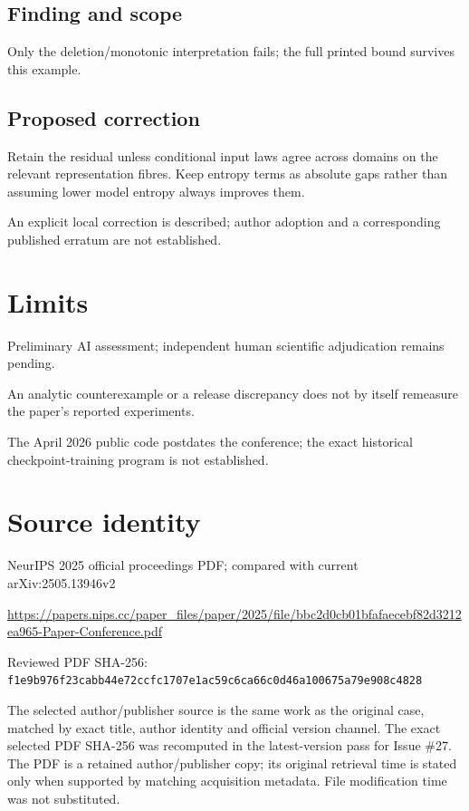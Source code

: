 \documentclass[11pt]{article}
\begin{document}
\subsection*{Finding and scope}

Only the deletion/monotonic interpretation fails; the full printed bound survives this example.

\subsection*{Proposed correction}

Retain the residual unless conditional input laws agree across domains on the relevant representation fibres. Keep entropy terms as absolute gaps rather than assuming lower model entropy always improves them.

An explicit local correction is described; author adoption and a corresponding published erratum are not established.

\section*{Limits}

Preliminary AI assessment; independent human scientific adjudication remains pending.\par

An analytic counterexample or a release discrepancy does not by itself remeasure the paper’s reported experiments.\par

The April 2026 public code postdates the conference; the exact historical checkpoint-training program is not established.\par

\section*{Source identity}

NeurIPS 2025 official proceedings PDF; compared with current arXiv:2505.13946v2

\url{https://papers.nips.cc/paper_files/paper/2025/file/bbc2d0cb01bfafaecebf82d3212ea965-Paper-Conference.pdf}

Reviewed PDF SHA-256: \nolinkurl{f1e9b976f23cabb44e72ccfc1707e1ac59c6ca66c0d46a100675a79e908c4828}

The selected author/publisher source is the same work as the original case, matched by exact title, author identity and official version channel. The exact selected PDF SHA-256 was recomputed in the latest-version pass for Issue \#27. The PDF is a retained author/publisher copy; its original retrieval time is stated only when supported by matching acquisition metadata. File modification time was not substituted.
\end{document}
